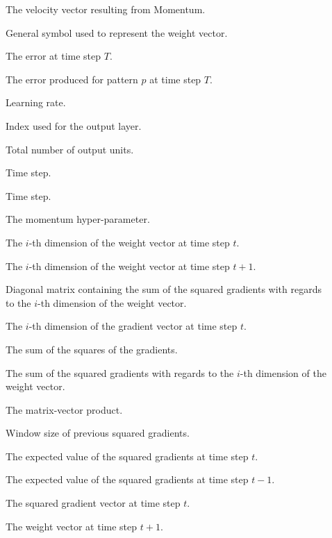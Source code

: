 \begin{description}
	\item [\parbox{2cm}{$\boldsymbol{v}$}] The velocity vector resulting from \acs{Momentum}.
	\item [\parbox{2cm}{$\boldsymbol{w}$}] General symbol used to represent the weight vector.
	\item [\parbox{2cm}{$\epsilon_{T}$}] The error at time step $T$.
	\item [\parbox{2cm}{$\epsilon_{T_{p}}$}] The error produced for pattern $p$ at time step $T$.
	\item [\parbox{2cm}{$\eta$}] Learning rate.
	\item [\parbox{2cm}{$k$}] Index used for the output layer.
	\item [\parbox{2cm}{$K$}] Total number of output units.
	\item [\parbox{2cm}{$t$}] Time step.
	\item [\parbox{2cm}{$T$}] Time step.
	\item [\parbox{2cm}{$\alpha$}] The momentum hyper-parameter.
	\item [\parbox{2cm}{$w_{t,i}$}] The $i$-th dimension of the weight vector at time step $t$.
	\item [\parbox{2cm}{$w_{t+1,i}$}] The $i$-th dimension of the weight vector at time step $t+1$.
	\item [\parbox{2cm}{$G_{t,ii}$}] Diagonal matrix containing the sum of the squared gradients with regards to the $i$-th dimension of the weight vector.
	\item [\parbox{2cm}{$g_{t,i}$}] The $i$-th dimension of the gradient vector at time step $t$.
	\item [\parbox{2cm}{$\boldsymbol{G_{t}}$}] The sum of the squares of the gradients.
	\item [\parbox{2cm}{$G_{t,i}$}] The sum of the squared gradients with regards to the $i$-th dimension of the weight vector.
	\item [\parbox{2cm}{$\odot$}] The matrix-vector product.
	\item [\parbox{2cm}{$W$}] Window size of previous squared gradients.
	\item [\parbox{2cm}{$E[\boldsymbol{g}^{2}]_{t}$}] The expected value of the squared gradients at time step $t$.
	\item [\parbox{2cm}{$E[\boldsymbol{g}^{2}]_{t - 1}$}] The expected value of the squared gradients at time step $t-1$.
	\item [\parbox{2cm}{$\boldsymbol{g}^{2}_{t}$}] The squared gradient vector at time step $t$.
	\item [\parbox{2cm}{$\boldsymbol{w}_{t+1}$}] The weight vector at time step $t+1$.

\end{description}
